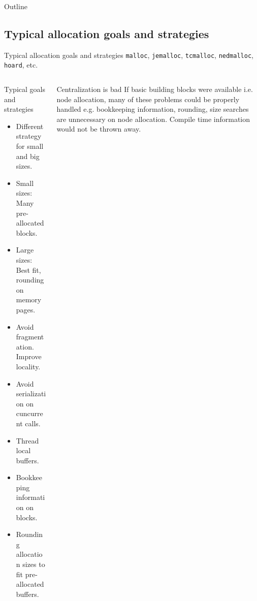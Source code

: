 \documentclass[10pt,aspectratio=169]{beamer}
\begin{document}
\begin{frame}{Outline}
\end{frame}

\subsection{Typical allocation goals and strategies}

\begin{frame}{Typical allocation goals and strategies}
{\texttt{malloc}, \texttt{jemalloc}, \texttt{tcmalloc},
\texttt{nedmalloc}, \texttt{hoard}, etc.}
\begin{columns}
\begin{column}{0.47\textwidth}
\begin{block} {Typical goals and strategies}
\begin{itemize}
\item Different strategy for small and big sizes.
\item Small sizes: Many pre-allocated blocks.
\item Large sizes: Best fit, rounding on memory pages.
\item Avoid fragmentation. Improve locality.
\item Avoid serialization on cuncurrent calls.
\item Thread local buffers.
\item Bookkeeping information on blocks.
\item Rounding allocation sizes to fit pre-allocated buffers.
\end{itemize}
\end{block}
\end{column}

\begin{column}{0.47\textwidth}
\begin{block} {Centralization is bad}
If basic building blocks were available i.e. node allocation,
many of these problems could be properly handled e.g.
bookkeeping information, rounding, size searches
are unnecessary on node allocation. Compile time information would not
be thrown away.
\end{block}

\end{column}
\end{columns}
\end{frame}
\end{document}
